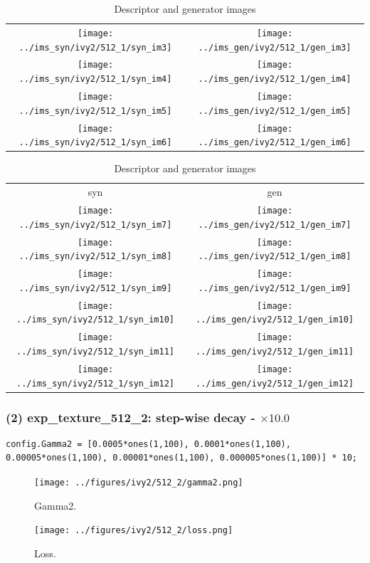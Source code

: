 \documentclass[letter]{article}
\begin{document}
\begin{table}[h!]
\begin{tabular}{cc}
		\texttt{[image: ../ims\_syn/ivy2/512\_1/syn\_im3]} & \texttt{[image: ../ims\_gen/ivy2/512\_1/gen\_im3]} \tabularnewline
		\texttt{[image: ../ims\_syn/ivy2/512\_1/syn\_im4]} & \texttt{[image: ../ims\_gen/ivy2/512\_1/gen\_im4]} \tabularnewline
		\texttt{[image: ../ims\_syn/ivy2/512\_1/syn\_im5]} & \texttt{[image: ../ims\_gen/ivy2/512\_1/gen\_im5]} \tabularnewline
		\texttt{[image: ../ims\_syn/ivy2/512\_1/syn\_im6]} & \texttt{[image: ../ims\_gen/ivy2/512\_1/gen\_im6]} \tabularnewline
	\end{tabular}
	\begin{tabular}{cc}
		syn & gen\tabularnewline
		\texttt{[image: ../ims\_syn/ivy2/512\_1/syn\_im7]} & \texttt{[image: ../ims\_gen/ivy2/512\_1/gen\_im7]} \tabularnewline
		\texttt{[image: ../ims\_syn/ivy2/512\_1/syn\_im8]} & \texttt{[image: ../ims\_gen/ivy2/512\_1/gen\_im8]} \tabularnewline
		\texttt{[image: ../ims\_syn/ivy2/512\_1/syn\_im9]} & \texttt{[image: ../ims\_gen/ivy2/512\_1/gen\_im9]} \tabularnewline
		\texttt{[image: ../ims\_syn/ivy2/512\_1/syn\_im10]} & \texttt{[image: ../ims\_gen/ivy2/512\_1/gen\_im10]} \tabularnewline
		\texttt{[image: ../ims\_syn/ivy2/512\_1/syn\_im11]} & \texttt{[image: ../ims\_gen/ivy2/512\_1/gen\_im11]} \tabularnewline
		\texttt{[image: ../ims\_syn/ivy2/512\_1/syn\_im12]} & \texttt{[image: ../ims\_gen/ivy2/512\_1/gen\_im12]} \tabularnewline
	\end{tabular}
	\caption{Descriptor and generator images}
\end{table}

\newpage

\subsubsection*{(2) exp\_texture\_512\_2: step-wise decay - $\times10.0$}

\begin{lstlisting}
config.Gamma2 = [0.0005*ones(1,100), 0.0001*ones(1,100), 0.00005*ones(1,100), 0.00001*ones(1,100), 0.000005*ones(1,100)] * 10;
\end{lstlisting}

\begin{figure}[h!]
	\centering
	\texttt{[image: ../figures/ivy2/512\_2/gamma2.png]}
	\caption{\label{fig:gamma1}Gamma2.}
\end{figure}

\begin{figure}[h!]
	\centering
	\texttt{[image: ../figures/ivy2/512\_2/loss.png]}
	\caption{\label{fig:gamma1}Loss.}
\end{figure}
\end{document}

